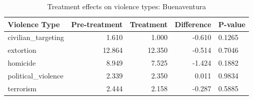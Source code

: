 \begin{table}

\caption{\label{tab:tab:treatment_buenaventura}Treatment effects on violence types: Buenaventura}
\centering
\begin{tabular}[t]{lrrrl}
\toprule
Violence Type & Pre-treatment & Treatment & Difference & P-value\\
\midrule
civilian\_targeting & 1.610 & 1.000 & -0.610 & 0.1265\\
extortion & 12.864 & 12.350 & -0.514 & 0.7046\\
homicide & 8.949 & 7.525 & -1.424 & 0.1882\\
political\_violence & 2.339 & 2.350 & 0.011 & 0.9834\\
terrorism & 2.444 & 2.158 & -0.287 & 0.5885\\
\bottomrule
\end{tabular}
\end{table}
